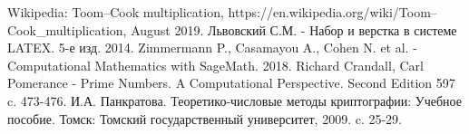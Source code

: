 \documentclass[11pt]{article}
\begin{document}
\begin{thebibliography}{5}
Wikipedia: Toom–Cook multiplication, https://en.wikipedia.org/wiki/Toom–Cook\_multiplication, August 2019.
Львовский С.М. - Набор и верстка в системе LATEX. 5-е изд. 2014.
Zimmermann P., Casamayou A., Cohen N. et al. - Computational Mathematics with SageMath. 2018.
 Richard Crandall, Carl Pomerance - Prime Numbers. A Computational Perspective. Second Edition 597 c. 473-476.
 И.А. Панкратова. Теоретико-числовые методы криптографии: Учебное пособие. Томск: Томский государственный университет, 2009. c. 25-29.
\end{thebibliography}
\end{document}
